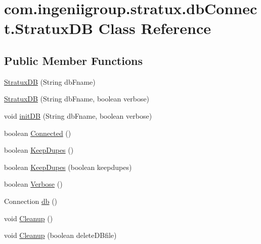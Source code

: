 \hypertarget{classcom_1_1ingeniigroup_1_1stratux_1_1db_connect_1_1_stratux_d_b}{}\section{com.\+ingeniigroup.\+stratux.\+db\+Connect.\+Stratux\+DB Class Reference}
\label{classcom_1_1ingeniigroup_1_1stratux_1_1db_connect_1_1_stratux_d_b}
\subsection*{Public Member Functions}
\begin{DoxyCompactItemize}
\item 
\hyperlink{classcom_1_1ingeniigroup_1_1stratux_1_1db_connect_1_1_stratux_d_b_a88abbece32528e7f968cf631abada29d}{Stratux\+DB} (String db\+Fname)
\item 
\hyperlink{classcom_1_1ingeniigroup_1_1stratux_1_1db_connect_1_1_stratux_d_b_a262ca6924cdac40e202102213c7e217e}{Stratux\+DB} (String db\+Fname, boolean verbose)
\item 
void \hyperlink{classcom_1_1ingeniigroup_1_1stratux_1_1db_connect_1_1_stratux_d_b_a3266867c1ec4338f4324440116140324}{init\+DB} (String db\+Fname, boolean verbose)
\item 
boolean \hyperlink{classcom_1_1ingeniigroup_1_1stratux_1_1db_connect_1_1_stratux_d_b_a39aebddb50494a6d2c228b6df180ed75}{Connected} ()
\item 
boolean \hyperlink{classcom_1_1ingeniigroup_1_1stratux_1_1db_connect_1_1_stratux_d_b_aa590098f5a32abc988bd52985b2e1282}{Keep\+Dupes} ()
\item 
boolean \hyperlink{classcom_1_1ingeniigroup_1_1stratux_1_1db_connect_1_1_stratux_d_b_a8688142956ed7581a645da10c25a8197}{Keep\+Dupes} (boolean keepdupes)
\item 
boolean \hyperlink{classcom_1_1ingeniigroup_1_1stratux_1_1db_connect_1_1_stratux_d_b_a3a3d9da8dd899bb33aa69b1edfc30971}{Verbose} ()
\item 
Connection \hyperlink{classcom_1_1ingeniigroup_1_1stratux_1_1db_connect_1_1_stratux_d_b_a64f5441f879b6d52bd4c5903db34eda3}{db} ()
\item 
void \hyperlink{classcom_1_1ingeniigroup_1_1stratux_1_1db_connect_1_1_stratux_d_b_a96d41551a9e34f248e73d0e6b44a0300}{Cleanup} ()
\item 
void \hyperlink{classcom_1_1ingeniigroup_1_1stratux_1_1db_connect_1_1_stratux_d_b_a14a0619669525324b71954015e681983}{Cleanup} (boolean delete\+D\+Bfile)

\end{DoxyCompactItemize}
